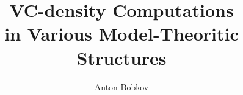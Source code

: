 \documentclass [PhD] {uclathes}
\title          {VC-density Computations \\
                in Various Model-Theoritic Structures}
\author         {Anton Bobkov}
\begin{document}
 
\makeintropages




 




\end{document}
